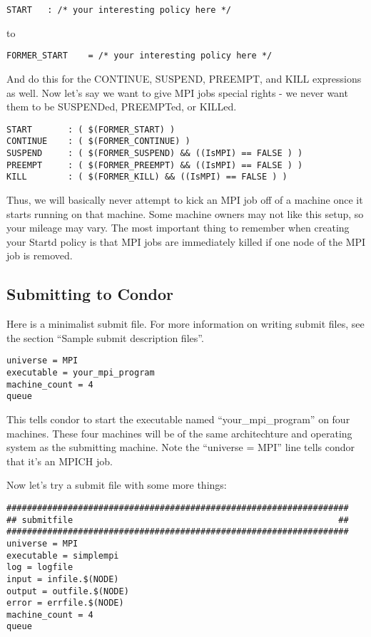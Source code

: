 \begin{verbatim}
START	: /* your interesting policy here */
\end{verbatim}

to 

\begin{verbatim}
FORMER_START	= /* your interesting policy here */
\end{verbatim}

And do this for the CONTINUE, SUSPEND, PREEMPT, and KILL expressions 
as well.  Now let's say we want to give MPI jobs special rights - we 
never want them to be SUSPENDed, PREEMPTed, or KILLed.  

\begin{verbatim}
START		: ( $(FORMER_START) )
CONTINUE	: ( $(FORMER_CONTINUE) )
SUSPEND		: ( $(FORMER_SUSPEND) && ((IsMPI) == FALSE ) )
PREEMPT		: ( $(FORMER_PREEMPT) && ((IsMPI) == FALSE ) )
KILL		: ( $(FORMER_KILL) && ((IsMPI) == FALSE ) )
\end{verbatim}

Thus, we will basically never attempt to kick an MPI job off of 
a machine once it starts running on that machine.  Some machine
owners may not like this setup, so your mileage may vary.  The most
important thing to remember when creating your Startd policy is that
MPI jobs are immediately killed if one node of the MPI job is removed.

\subsection{\label{sec:MPI-submit}Submitting to Condor}

Here is a minimalist submit file.  For more information on writing
submit files, see the section ``Sample submit description files''.

\begin{verbatim}
universe = MPI
executable = your_mpi_program
machine_count = 4
queue 
\end{verbatim}

This tells condor to start the executable named ``your\_mpi\_program'' 
on four machines.  These four machines will be of the same architechture
and operating system as the submitting machine.  Note the 
``universe = MPI'' line tells condor that it's an MPICH job.  

Now let's try a submit file with some more things:

\begin{verbatim}
###################################################################
## submitfile                                                    ##
###################################################################
universe = MPI
executable = simplempi
log = logfile
input = infile.$(NODE)
output = outfile.$(NODE)
error = errfile.$(NODE)
machine_count = 4
queue
\end{verbatim}

